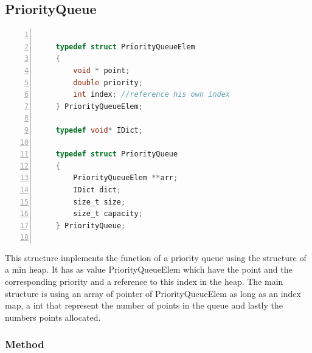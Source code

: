 \documentclass[twoside,12pt, a4paper]{report}
\begin{document}
\subsection{PriorityQueue}

\begin{lstlisting}[language=C, % Spécifie le langage du code
	caption={PriorityQueue}, % Légende du listing
	label=lst:prqueue_c, % Étiquette pour référencer le listing
	numbers=left, 
	numberstyle=\tiny\color{gray}, 
	stepnumber=1, 
	frame=single,
	breaklines=true, 
	postbreak=\mbox{\textcolor{red}{$\hookrightarrow$}\space},
	showstringspaces=false 
	]
	
	typedef struct PriorityQueueElem
	{
		void * point;
		double priority;
		int index; //reference his own index
	} PriorityQueueElem;
	
	typedef void* IDict;
	
	typedef struct PriorityQueue
	{
		PriorityQueueElem **arr;
		IDict dict;
		size_t size;
		size_t capacity;
	} PriorityQueue;
	
\end{lstlisting}
\vspace{1cm}
This structure implements the function of a priority queue using the structure of a min heap. It has as value PriorityQueueElem which have the point and the corresponding priority and a reference to this index in the heap. The main structure is using an array of pointer of PriorityQueueElem as long as an index map, a int that represent the number of points in the queue and lastly the numbers points allocated. 

\subsubsection{Method}
\end{document}
